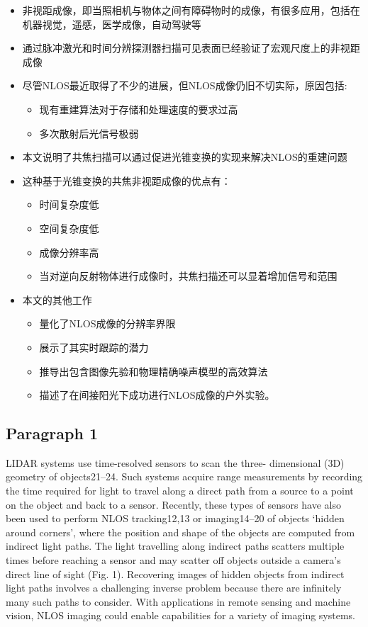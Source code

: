 \documentclass[11pt]{article}
\providecommand{\tightlist}{%
      \setlength{\itemsep}{0pt}\setlength{\parskip}{0pt}}
\begin{document}
\begin{itemize}
\tightlist
\item
  非视距成像，即当照相机与物体之间有障碍物时的成像，有很多应用，包括在机器视觉，遥感，医学成像，自动驾驶等
\item
  通过脉冲激光和时间分辨探测器扫描可见表面已经验证了宏观尺度上的非视距成像
\item
  尽管NLOS最近取得了不少的进展，但NLOS成像仍旧不切实际，原因包括:

  \begin{itemize}
  \tightlist
  \item
    现有重建算法对于存储和处理速度的要求过高
  \item
    多次散射后光信号极弱
  \end{itemize}
\item
  本文说明了共焦扫描可以通过促进光锥变换的实现来解决NLOS的重建问题
\item
  这种基于光锥变换的共焦非视距成像的优点有：

  \begin{itemize}
  \tightlist
  \item
    时间复杂度低
  \item
    空间复杂度低
  \item
    成像分辨率高
  \item
    当对逆向反射物体进行成像时，共焦扫描还可以显着增加信号和范围
  \end{itemize}
\item
  本文的其他工作

  \begin{itemize}
  \tightlist
  \item
    量化了NLOS成像的分辨率界限
  \item
    展示了其实时跟踪的潜力
  \item
    推导出包含图像先验和物理精确噪声模型的高效算法
  \item
    描述了在间接阳光下成功进行NLOS成像的户外实验。
  \end{itemize}
\end{itemize}

    \subsection{Paragraph 1}\label{paragraph-1}

LIDAR systems use time-resolved sensors to scan the three- dimensional
(3D) geometry of objects21--24. Such systems acquire range measurements
by recording the time required for light to travel along a direct path
from a source to a point on the object and back to a sensor. Recently,
these types of sensors have also been used to perform NLOS tracking12,13
or imaging14--20 of objects `hidden around corners', where the position
and shape of the objects are computed from indirect light paths. The
light travelling along indirect paths scatters multiple times before
reaching a sensor and may scatter off objects outside a camera's direct
line of sight (Fig. 1). Recovering images of hidden objects from
indirect light paths involves a challenging inverse problem because
there are infinitely many such paths to consider. With applications in
remote sensing and machine vision, NLOS imaging could enable
capabilities for a variety of imaging systems.
\end{document}
